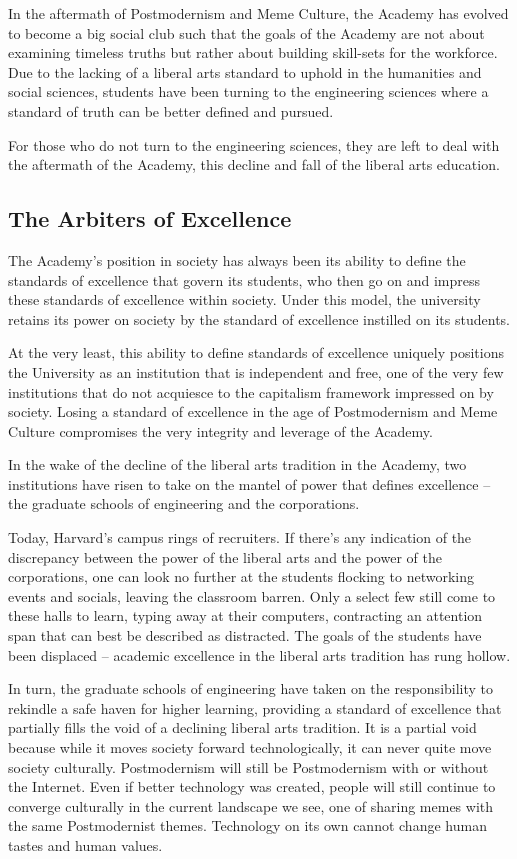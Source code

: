 \documentclass[12pt,letterpaper]{article}
\begin{document}
In the aftermath of Postmodernism and Meme Culture, the Academy has evolved to become a big social club such that the goals of the Academy are not about examining timeless truths but rather about building skill-sets for the workforce.  Due to the lacking of a liberal arts standard to uphold in the humanities and social sciences, students have been turning to the engineering sciences where a standard of truth can be better defined and pursued.  

For those who do not turn to the engineering sciences, they are left to deal with the aftermath of the Academy, this decline and fall of the liberal arts education.   

\subsection{The Arbiters of Excellence}
The Academy's position in society has always been its ability to define the standards of excellence that govern its students, who then go on and impress these standards of excellence within society.  Under this model, the university retains its power on society by the standard of excellence instilled on its students. 

At the very least, this ability to define standards of excellence uniquely positions the University as an institution that is independent and free, one of the very few institutions that do not acquiesce to the capitalism framework impressed on by society.  Losing a standard of excellence in the age of Postmodernism and Meme Culture compromises the very integrity and leverage of the Academy.

In the wake of the decline of the liberal arts tradition in the Academy, two institutions have risen to take on the mantel of power that defines excellence -- the graduate schools of engineering and the corporations.

Today, Harvard's campus rings of recruiters.  If there's any indication of the discrepancy between the power of the liberal arts and the power of the corporations, one can look no further at the students flocking to networking events and socials, leaving the classroom barren.  Only a select few still come to these halls to learn, typing away at their computers,  contracting an attention span that can best be described as distracted.  The goals of the students have been displaced -- academic excellence in the liberal arts tradition has rung hollow.

In turn, the graduate schools of engineering have taken on the responsibility to rekindle a safe haven for higher learning, providing a standard of excellence that partially fills the void of a declining liberal arts tradition.  It is a partial void because while it moves society forward technologically, it can never quite move society culturally.  Postmodernism will still be Postmodernism  with or without the Internet.  Even if better technology was created, people will still continue to converge culturally in the current landscape we see, one of sharing memes with the same Postmodernist themes.  Technology on its own cannot change human tastes and human values.
\end{document}
